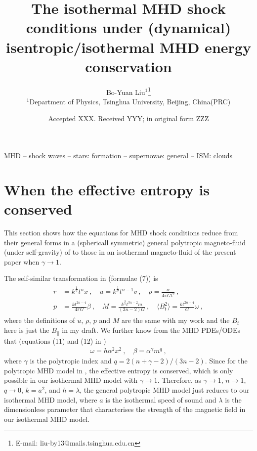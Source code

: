 \documentclass[fleqn,usenatbib]{mnras}
\title[Report on September 8]{The isothermal MHD shock conditions under (dynamical) isentropic/isothermal MHD energy conservation}
\author[Bo-Yuan Liu]{Bo-Yuan Liu$^{1}$\thanks{E-mail: liu-by13@mails.tsinghua.edu.cn}
\\
$^{1}$Department of Physics, Tsinghua University, Beijing, China(PRC)\\
}
\date{Accepted XXX. Received YYY; in original form ZZZ}
\begin{document}
\label{firstpage}
\pagerange{\pageref{firstpage}--\pageref{lastpage}}
\maketitle
\begin{keywords}
MHD -- shock waves -- stars: formation -- supernovae: general -- ISM: clouds
\end{keywords}



 
\section{When the effective entropy is conserved}
This section shows how the equations for MHD shock conditions reduce from their general forms in a (sphericall symmetric) general polytropic magneto-fluid (under self-gravity) of \citet{wang2008dynamic} to those in an isothermal magneto-fluid of the present paper when $\gamma\rightarrow 1$.

The self-similar transformation in \citet{wang2008dynamic} (formulae (7)) is
\begin{gather}
\begin{split}
r&=k^{\frac{1}{2}}t^{n}x\ ,\quad u=k^{\frac{1}{2}}t^{n-1}v\ ,\quad \rho=\frac{\alpha}{4\pi Gt^{2}}\ ,\\
p&=\frac{kt^{2n-4}}{4\pi G}\beta\ ,\quad M=\frac{k^{\frac{3}{2}}t^{3n-2}m}{(3n-2)G}\ ,\quad \langle B^{2}_{t}\rangle=\frac{kt^{2n-4}}{G}\omega\ ,
\end{split}\label{e1}
\end{gather}
where the definitions of $u$, $\rho$, $p$ and $M$ are
the same with my work and the $B_{t}$ here is just the $B_{\parallel}$ in my draft. We further know from the MHD PDEs/ODEs that (equations (11) and (12) in \citet{wang2008dynamic}) 
\begin{gather}
\omega=h\alpha^{2}x^{2}\ ,\quad \beta=\alpha^{\gamma}m^{q}\ ,\label{e2}
\end{gather}
where $\gamma$ is the polytropic index and $q=2(n+\gamma-2)/(3n-2)$. Since for the polytropic MHD model in \citet{wang2008dynamic}, the effective entropy is conserved, which is only possible in our isothermal MHD model with $\gamma\rightarrow 1$. Therefore, as $\gamma\rightarrow 1$, $n\rightarrow 1$, $q\rightarrow 0$, $k=a^{2}$, and $h=\lambda$, the general polytropic MHD model just reduces to our isothermal MHD model, where $a$ is the isothermal speed of sound and $\lambda$ is the dimensionless parameter that characterises the strength of the magnetic field in our isothermal MHD model.
\end{document}
